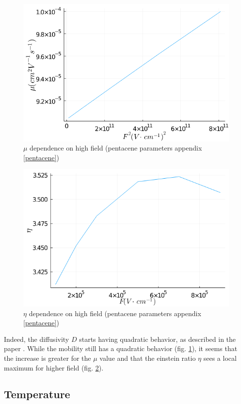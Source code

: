 \begin{figure}[!h]
    \centering
    \includegraphics*[width=.5\paperwidth]{figures/3_elec/mobi_field_high_square.png}
    \caption{$\mu$ dependence on high field (pentacene parameters appendix \ref{pentacene})\label{fig:3_17}}
\end{figure}

\begin{figure}[!h]
    \centering
    \includegraphics*[width=.5\paperwidth]{figures/3_elec/ein_field_high.png}
    \caption{$\eta$ dependence on high field (pentacene parameters appendix \ref{pentacene})\label{fig:3_18}}
\end{figure}

Indeed, the diffusivity $D$ starts having quadratic behavior, as described in the paper \cite{general_einstein}. While the mobility still has a quadratic behavior (fig. \ref{fig:3_17}), it seems that the increase is greater for the $\mu$ value and that the einstein ratio $\eta$ sees a local maximum for higher field (fig. \ref{fig:3_18}).

\subsection{Temperature}